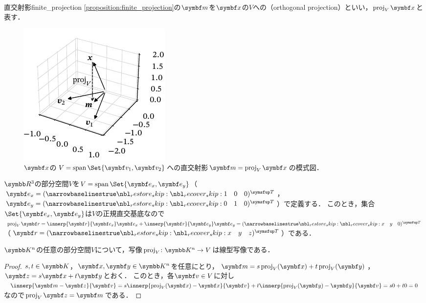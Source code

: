 \documentclass[../../main]{subfiles}
\begin{document}
\begin{definition}{直交射影}{finite_projection}
  \cref{proposition:finite_projection}の\(\vect{m}\)を\(\vect{x}\)の\(V\)への（orthogonal projection）といい，\(\proj_V\vect{x}\)と表す．
\end{definition}

\begin{figure}[htbp]
  \centering
  \includegraphics{figures/proj3d.pdf}
  \caption{\(\vect{x}\)の\(V=\spannedby\Set{\vect{v}_1,\vect{v}_2}\)への直交射影\(\vect{m}=\proj_V\vect{x}\)の模式図．}
\end{figure}

\begin{example}
  \(\numset{R}^3\)の部分空間\(V\)を\(V=\spannedby\Set{\vect{e}_x,\vect{e}_y}\)（\(\vect{e}_x=\trps{\rowvect{1 & 0 & 0}}\)，\(\vect{e}_y=\trps{\rowvect{0 & 1 & 0}}\)）で定義する．
  このとき，集合\(\Set{\vect{e}_x,\vect{e}_y}\)は\(V\)の正規直交基底なので\(\proj_V\vect{r}=\innerp{\vect{r}}{\vect{e}_x}\vect{e}_x+\innerp{\vect{r}}{\vect{e}_y}\vect{e}_y=\trps{\rowvect{x & y & 0}}\)（\(\vect{r}=\trps{\rowvect{x & y & z}}\)）である．
\end{example}

\begin{proposition}{}{}
  \(\numset{K}^n\)の任意の部分空間\(V\)について，写像\(\proj_V\colon\numset{K}^n\to V\)は線型写像である．
\end{proposition}

\begin{proof}
  \(s,t\in\numset{K}\)，\(\vect{x},\vect{y}\in\numset{K}^n\)を任意にとり，\(\vect{m}=s\proj_V(\vect{x})+t\proj_V(\vect{y})\)，\(\vect{z}=s\vect{x}+t\vect{y}\)とおく．
  このとき，各\(\vect{v}\in V\)に対し\(\innerp{\vect{m}-\vect{z}}{\vect{v}}=s\innerp{\proj_V(\vect{x})-\vect{x}}{\vect{v}}+t\innerp{\proj_V(\vect{y})-\vect{y}}{\vect{v}}=s0+t0=0\)なので\(\proj_V\vect{z}=\vect{m}\)である．
\end{proof}
\end{document}
